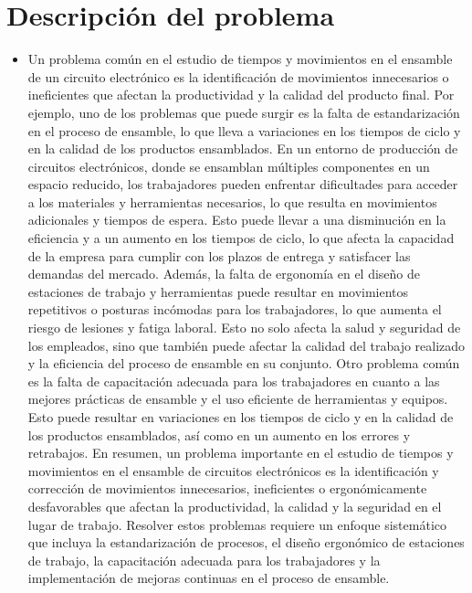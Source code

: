     \section{Descripción del problema}
    \begin{itemize}
        \item Un problema común en el estudio de tiempos y movimientos en el ensamble de un circuito electrónico es la identificación de movimientos innecesarios o ineficientes que afectan la productividad y la calidad del producto final. Por ejemplo, uno de los problemas que puede surgir es la falta de estandarización en el proceso de ensamble, lo que lleva a variaciones en los tiempos de ciclo y en la calidad de los productos ensamblados.
    En un entorno de producción de circuitos electrónicos, donde se ensamblan múltiples componentes en un espacio reducido, los trabajadores pueden enfrentar dificultades para acceder a los materiales y herramientas necesarios, lo que resulta en movimientos adicionales y tiempos de espera. Esto puede llevar a una disminución en la eficiencia y a un aumento en los tiempos de ciclo, lo que afecta la capacidad de la empresa para cumplir con los plazos de entrega y satisfacer las demandas del mercado.
    Además, la falta de ergonomía en el diseño de estaciones de trabajo y herramientas puede resultar en movimientos repetitivos o posturas incómodas para los trabajadores, lo que aumenta el riesgo de lesiones y fatiga laboral. Esto no solo afecta la salud y seguridad de los empleados, sino que también puede afectar la calidad del trabajo realizado y la eficiencia del proceso de ensamble en su conjunto.
    Otro problema común es la falta de capacitación adecuada para los trabajadores en cuanto a las mejores prácticas de ensamble y el uso eficiente de herramientas y equipos. Esto puede resultar en variaciones en los tiempos de ciclo y en la calidad de los productos ensamblados, así como en un aumento en los errores y retrabajos.
    En resumen, un problema importante en el estudio de tiempos y movimientos en el ensamble de circuitos electrónicos es la identificación y corrección de movimientos innecesarios, ineficientes o ergonómicamente desfavorables que afectan la productividad, la calidad y la seguridad en el lugar de trabajo. Resolver estos problemas requiere un enfoque sistemático que incluya la estandarización de procesos, el diseño ergonómico de estaciones de trabajo, la capacitación adecuada para los trabajadores y la implementación de mejoras continuas en el proceso de ensamble.
    \end{itemize}
    

